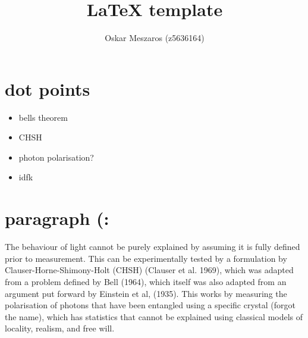 \documentclass{article}
\title{LaTeX template}
\author{Oskar Meszaros (z5636164)}
\date{}
\begin{document}
\maketitle
\section{dot points}
\begin{itemize}
    \item bells theorem
    \item CHSH
    \item photon polarisation?
    \item idfk
\end{itemize}

\section{paragraph (:}

The behaviour of light cannot be purely explained by assuming it is fully defined prior to measurement. This can be experimentally tested by a formulation by Clauser-Horne-Shimony-Holt (CHSH) (Clauser et al. 1969), which was adapted from a problem defined by Bell (1964), which itself was also adapted from an argument put forward by Einstein et al, (1935). This works by measuring the polarisation of photons that have been entangled using a specific crystal (forgot the name), which has statistics that cannot be explained using classical models of locality, realism, and free will.
\end{document}
